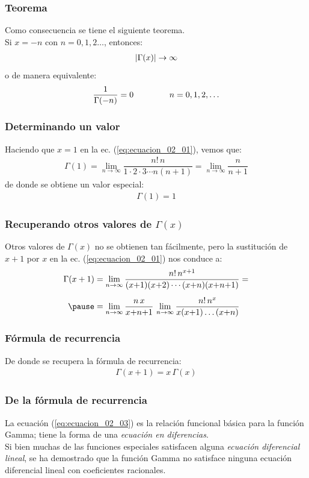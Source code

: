 \documentclass[12pt]{beamer}
\begin{document}
\begin{frame}
\frametitle{Teorema}
Como consecuencia se tiene el siguiente teorema.
\\
\bigskip
\pause
Si $x = - n$ con $n = 0, 1, 2 \ldots$, entonces:
\begin{align*}
\abs{\Gamma (x)} \to \infty
\end{align*}
\pause
o de manera equivalente:
\begin{align*}
\dfrac{1}{\Gamma (-n)} = 0 \hspace{1.5cm} n = 0, 1, 2, \ldots
\end{align*}
\end{frame}
\begin{frame}
\frametitle{Determinando un valor}
Haciendo que $x = 1$ en la ec. (\ref{eq:ecuacion_02_01}), vemos que:
\pause
\begin{align*}
\Gamma (1) = \lim_{n \to \infty} \dfrac{n! \, n}{1 \cdot 2 \cdot 3 \cdots n (n + 1)} = \lim_{n \to \infty} \dfrac{n}{n + 1}
\end{align*}
\pause
de donde se obtiene un valor especial:
\begin{align}
\Gamma (1) = 1
\label{eq:ecuacion_02_02}
\end{align}
\end{frame}
\begin{frame}
\frametitle{Recuperando otros valores de $\Gamma (x)$}
Otros valores de $\Gamma (x)$ no se obtienen tan fácilmente, pero la sustitución de $x + 1$ por $x$ en la ec. (\ref{eq:ecuacion_02_01}) nos conduce a:
\pause
\begin{eqnarray*}
\begin{aligned}
\Gamma (x + 1) &= \lim_{n \to \infty} \dfrac{n! \, n^{x+1}}{(x {+} 1)(x {+} 2) \cdots (x {+} n)(x {+} n {+} 1)} = \\[0.5em] \pause
&= \lim_{n \to \infty} \dfrac{n \, x}{x {+} n {+} 1} \, \lim_{n \to \infty} \dfrac{n! \, n^{x}}{x (x {+} 1) \ldots (x {+} n)}
\end{aligned}
\end{eqnarray*}
\end{frame}
\begin{frame}
\frametitle{Fórmula de recurrencia}
De donde se recupera la fórmula de recurrencia:
\pause
\begin{align}
\Gamma (x + 1) =  x \, \Gamma (x)
\label{eq:ecuacion_02_03}
\end{align}
\end{frame}
\begin{frame}
\frametitle{De la fórmula de recurrencia}
La ecuación (\ref{eq:ecuacion_02_03}) es la relación funcional básica para la función Gamma; tiene la forma de una \emph{ecuación en diferencias}.
\\
\bigskip
\pause
Si bien muchas de las funciones especiales satisfacen alguna \emph{ecuación diferencial lineal}, se ha demostrado que la función Gamma no satisface ninguna ecuación diferencial lineal con coeficientes racionales.
\end{frame}
\end{document}
